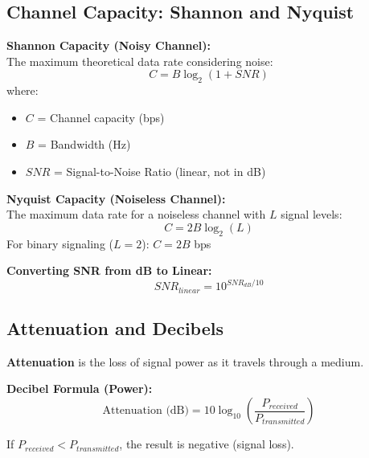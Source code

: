 \documentclass[12pt,a4paper]{article}
\begin{document}
\subsection{Channel Capacity: Shannon and Nyquist}

\begin{contextbox}
\textbf{Shannon Capacity (Noisy Channel):}\\
The maximum theoretical data rate considering noise:
\[C = B \log_2(1 + SNR)\]
where:
\begin{itemize}
    \item $C$ = Channel capacity (bps)
    \item $B$ = Bandwidth (Hz)
    \item $SNR$ = Signal-to-Noise Ratio (linear, not in dB)
\end{itemize}

\vspace{0.5em}
\textbf{Nyquist Capacity (Noiseless Channel):}\\
The maximum data rate for a noiseless channel with $L$ signal levels:
\[C = 2B \log_2(L)\]
For binary signaling ($L = 2$): $C = 2B$ bps

\vspace{0.5em}
\textbf{Converting SNR from dB to Linear:}
\[SNR_{linear} = 10^{SNR_{dB}/10}\]
\end{contextbox}

\subsection{Attenuation and Decibels}

\begin{contextbox}
\textbf{Attenuation} is the loss of signal power as it travels through a medium.

\textbf{Decibel Formula (Power):}
\[\text{Attenuation (dB)} = 10 \log_{10}\left(\frac{P_{received}}{P_{transmitted}}\right)\]

If $P_{received} < P_{transmitted}$, the result is negative (signal loss).
\end{contextbox}

\newpage

\end{document}
